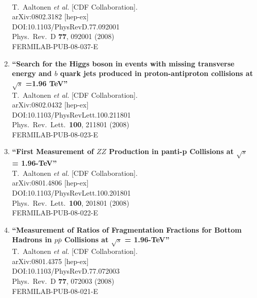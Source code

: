 \documentclass{article}
\begin{document}
\begin{enumerate}
  \\{}T.~Aaltonen {\it et al.} [CDF Collaboration].
  \\{}arXiv:0802.3182 [hep-ex]
  \\{}DOI:10.1103/PhysRevD.77.092001
  \\{}Phys.\ Rev.\ D {\bf 77}, 092001 (2008)
  \\{}FERMILAB-PUB-08-037-E
\item%
{\bf ``Search for the Higgs boson in events with missing transverse energy and $b$ quark jets produced in proton-antiproton collisions at $\sqrt{s}$ =1.96 TeV''}
  \\{}T.~Aaltonen {\it et al.} [CDF Collaboration].
  \\{}arXiv:0802.0432 [hep-ex]
  \\{}DOI:10.1103/PhysRevLett.100.211801
  \\{}Phys.\ Rev.\ Lett.\  {\bf 100}, 211801 (2008)
  \\{}FERMILAB-PUB-08-023-E
\item%
{\bf ``First Measurement of $Z Z$ Production in panti-p Collisions at $\sqrt{s}$ = 1.96-TeV''}
  \\{}T.~Aaltonen {\it et al.} [CDF Collaboration].
  \\{}arXiv:0801.4806 [hep-ex]
  \\{}DOI:10.1103/PhysRevLett.100.201801
  \\{}Phys.\ Rev.\ Lett.\  {\bf 100}, 201801 (2008)
  \\{}FERMILAB-PUB-08-022-E
\item%
{\bf ``Measurement of Ratios of Fragmentation Fractions for Bottom Hadrons in $p \bar{p}$ Collisions at $\sqrt{s}$ = 1.96-TeV''}
  \\{}T.~Aaltonen {\it et al.} [CDF Collaboration].
  \\{}arXiv:0801.4375 [hep-ex]
  \\{}DOI:10.1103/PhysRevD.77.072003
  \\{}Phys.\ Rev.\ D {\bf 77}, 072003 (2008)
  \\{}FERMILAB-PUB-08-021-E

\end{enumerate}
\end{document}
